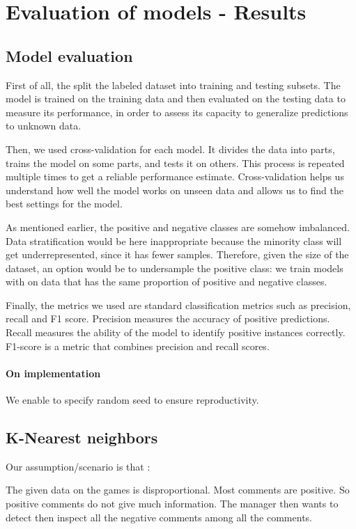 \documentclass{article}
\begin{document}
\section{Evaluation of models - Results}

\subsection{Model evaluation}

First of all, the split the labeled dataset into training and testing subsets. The model is trained on the training data and then evaluated on the testing data to measure its performance, in order to assess its capacity to generalize predictions to unknown data.

Then, we used cross-validation for each model. It divides the data into parts, trains the model on some parts, and tests it on others. This process is repeated multiple times to get a reliable performance estimate. Cross-validation helps us understand how well the model works on unseen data and allows us to find the best settings for the model.

As mentioned earlier, the positive and negative classes are somehow imbalanced. Data stratification would be here inappropriate because the minority class will get underrepresented, since it has fewer samples.
Therefore, given the size of the dataset, an option would be to undersample the positive class: we train models with on data that has the same proportion of positive and negative classes.

Finally, the metrics we used are standard classification metrics such as precision, recall and F1 score.
Precision measures the accuracy of positive predictions. Recall measures the ability of the model to identify positive instances correctly. F1-score is a metric that combines precision and recall scores.

\paragraph{On implementation} We enable to specify random seed to ensure reproductivity.

\subsection{K-Nearest neighbors}

Our assumption/scenario is that :

The given data on the games is disproportional. Most comments are
positive. So positive comments do not give much information.
The manager then wants to detect then inspect all the negative comments
among all the comments.
\end{document}
